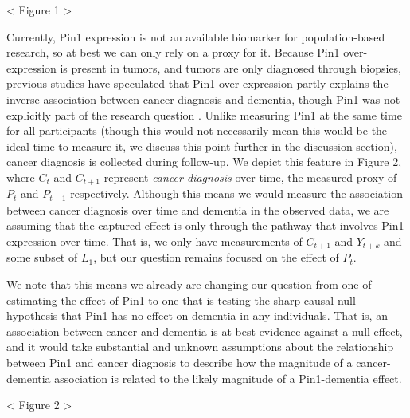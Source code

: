 \documentclass[
]{book}
\begin{document}
\textless{} Figure 1 \textgreater{}

Currently, Pin1 expression is not an available biomarker for population-based research, so at best we can only rely on a proxy for it. Because Pin1 over-expression is present in tumors, and tumors are only diagnosed through biopsies, previous studies have speculated that Pin1 over-expression partly explains the inverse association between cancer diagnosis and dementia, though Pin1 was not explicitly part of the research question \autocite{driver2012,musicco2013,freedman2016,bowles2017,frain2017,schmidt2017,sun2020,ording2020}. Unlike measuring Pin1 at the same time for all participants (though this would not necessarily mean this would be the ideal time to measure it, we discuss this point further in the discussion section), cancer diagnosis is collected during follow-up. We depict this feature in Figure 2, where \(C_t\) and \(C_{t+1}\) represent \emph{cancer diagnosis} over time, the measured proxy of \(P_{t}\) and \(P_{t+1}\) respectively. Although this means we would measure the association between cancer diagnosis over time and dementia in the observed data, we are assuming that the captured effect is only through the pathway that involves Pin1 expression over time. That is, we only have measurements of \(C_{t+1}\) and \(Y_{t+k}\) and some subset of \(L_1\), but our question remains focused on the effect of \(P_t\).

We note that this means we already are changing our question from one of estimating the effect of Pin1 to one that is testing the sharp causal null hypothesis that Pin1 has no effect on dementia in any individuals. That is, an association between cancer and dementia is at best evidence against a null effect, and it would take substantial and unknown assumptions about the relationship between Pin1 and cancer diagnosis to describe how the magnitude of a cancer-dementia association is related to the likely magnitude of a Pin1-dementia effect.

\textless{} Figure 2 \textgreater{}
\end{document}
